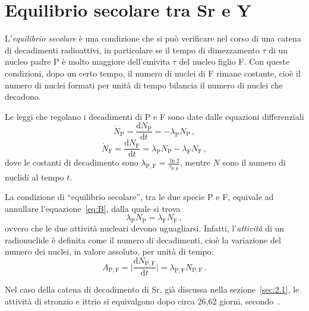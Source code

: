 \pagestyle{fancy}
\chapter[Equilibrio secolare]{Equilibrio secolare tra Sr e Y}
\label{app:B}
L'\emph{equilibrio secolare} è una condizione che si può verificare nel corso di %
una catena di decadimenti radioattivi, in particolare se il tempo di dimezzamento %
$\tau$ di un nucleo padre P è molto maggiore dell'emivita %
$\tau$ del nucleo figlio F.
Con queste condizioni, dopo un certo tempo, il numero di nuclei di F rimane %
costante, cioè il numero di nuclei formati per unità di tempo bilancia il numero %
di nuclei che decadono.

Le leggi che regolano i decadimenti di P e F sono date dalle equazioni %
differenziali
\begin{equation}
  \label{eq:A}
  \dot{N}_{\mathrm{P}} = \frac{\mathrm{d}N_{\mathrm{P}}}{\mathrm{d}t} = %
  - \lambda_{\mathrm{P}} N_{\mathrm{P}}\,,
\end{equation}
\begin{equation}
  \label{eq:B}
  \dot{N}_{\mathrm{F}} = \frac{\mathrm{d}N_{\mathrm{F}}}{\mathrm{d}t} = %
  \lambda_{\mathrm{P}} N_{\mathrm{P}}-\lambda_{\mathrm{F}} N_{\mathrm{F}}\,,
\end{equation} 
dove le costanti di decadimento sono $\lambda_{\mathrm{P,F}} = \frac{\ln 2}{\tau_{\mathrm{P,F}}}$, %
mentre $N$ sono il numero di nuclidi al tempo $t$.

La condizione di ``equilibrio secolare'', tra le due specie P e F, equivale ad annullare %
l'equazione~\ref{eq:B}, dalla quale si trova
\begin{equation}
  \lambda_{\mathrm{P}} N_{\mathrm{P}} = \lambda_{\mathrm{F}} N_{\mathrm{F}}\,,
\end{equation}
ovvero che le due attività nucleari devono uguagliarsi.
Infatti, l'\emph{attività} di un radionuclide è definita come il numero di decadimenti, cioè %
la variazione del numero dei nuclei, in valore assoluto, per unità di tempo:
\begin{equation}
  A_{\mathrm{P,F}} = \biggl |\frac{\mathrm{d}N_{\mathrm{P,F}}}{\mathrm{d}t}\biggr | = %
  \lambda_{\mathrm{P,F}} N_{\mathrm{P,F}} \,.
\end{equation}

Nel caso della catena di decadimento di Sr, già discussa nella sezione~\ref{sec:2.1}, %
le attività di stronzio e ittrio si equivalgono dopo circa 26,62 giorni, %
secondo~\cite{rep:spec}.

